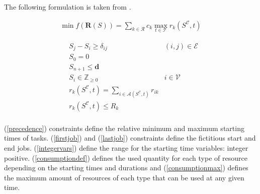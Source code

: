 \documentclass[a4paper,11pt]{article}
\begin{document}
    The following formulation is taken from \cite{Neumann2000}.

    \begin{align}
        \min f(\mathbf{R}(S)) = \sum_{k \in \mathcal{R}} c_k \max_{t \in \mathcal{T}} r_k(S^{\mathcal{C}}, t)
    \end{align}

    \begin{align}
        & S_j - S_i \geq \delta_{ij} & (i, j) \in \mathcal{E}  \label{precedence}\\
        & S_0 = 0 &  \label{firstjob}\\
        & S_{n+1} \leq \mathbf{d}   \label{lastjob}\\
        & S_{i} \in \mathbb{Z}_{\geq 0} & i \in \mathcal{V}  \label{integervars}\\
        & r_k(S^{\mathcal{C}}, t) = \sum_{i \in \mathcal{A}(S^{\mathcal{C}}, t)} r_{ik}  \label{consumptiondef}\\
        & r_k(S^{\mathcal{C}}, t) \leq R_k \label{consumptionmax}\\
    \end{align}

    (\ref{precedence}) constraints define the relative minimum and maximum starting times of tasks.
    (\ref{firstjob}) and (\ref{lastjob}) constraints define the fictitious start and end jobs.
    (\ref{integervars}) define the range for the starting time variables: integer positive.
    (\ref{consumptiondef}) defines the used quantity for each type of resource depending on the starting times and durations and (\ref{consumptionmax}) defines the maximum amount of resources of each type that can be used at any given time.



% 


\end{document}
